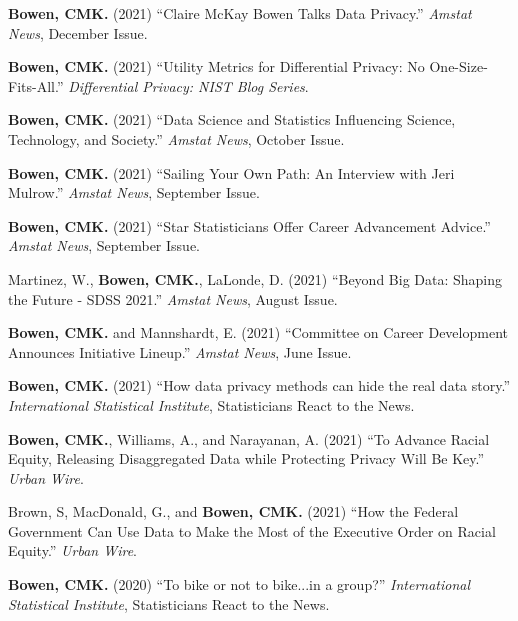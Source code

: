 \begin{etaremune}[topsep=0pt, itemsep=5pt, partopsep=0pt, parsep=0pt]
    \item \textbf{Bowen, CMK.} (2021) ``Claire McKay Bowen Talks Data Privacy.'' \textit{Amstat News}, December Issue.
    
    \item \textbf{Bowen, CMK.} (2021) ``Utility Metrics for Differential Privacy: No One-Size-Fits-All.'' \textit{Differential Privacy: NIST Blog Series}.
    
    \item \textbf{Bowen, CMK.} (2021) ``Data Science and Statistics Influencing Science, Technology, and Society.'' \textit{Amstat News}, October Issue.
    
    \item \textbf{Bowen, CMK.} (2021) ``Sailing Your Own Path: An Interview with Jeri Mulrow.'' \textit{Amstat News}, September Issue.

    \item \textbf{Bowen, CMK.} (2021) ``Star Statisticians Offer Career Advancement Advice.'' \textit{Amstat News}, September Issue.    
    
    \item Martinez, W., \textbf{Bowen, CMK.}, LaLonde, D. (2021) ``Beyond Big Data: Shaping the Future - SDSS 2021.'' \textit{Amstat News}, August Issue.   
    
    \item \textbf{Bowen, CMK.} and Mannshardt, E. (2021) ``Committee on Career Development Announces Initiative Lineup.'' \textit{Amstat News}, June Issue.

    \item \textbf{Bowen, CMK.} (2021) ``How data privacy methods can hide the real data story.'' \textit{International Statistical Institute}, Statisticians React to the News.
    
    \item \textbf{Bowen, CMK.}, Williams, A., and Narayanan, A. (2021) ``To Advance Racial Equity, Releasing Disaggregated Data while Protecting Privacy Will Be Key.'' \textit{Urban Wire}. 
    
    \item Brown, S, MacDonald, G., and \textbf{Bowen, CMK.} (2021) ``How the Federal Government Can Use Data to Make the Most of the Executive Order on Racial Equity.'' \textit{Urban Wire}. 

    \item \textbf{Bowen, CMK.} (2020) ``To bike or not to bike...in a group?'' \textit{International Statistical Institute}, Statisticians React to the News.


\end{etaremune}

